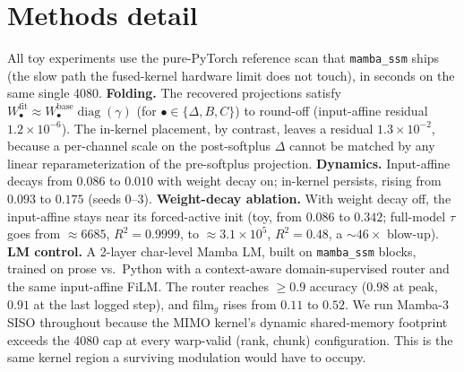 \documentclass{article}
\DeclareMathOperator{\diagop}{diag}
\newcommand{\diag}{\diagop}
\begin{document}
\section{Methods detail}\label{app:methods}

\noindent{}
\medskip

All toy experiments use the pure-PyTorch reference scan that \texttt{mamba\_ssm}
ships (the slow path the fused-kernel hardware limit does not touch), in seconds on
the same single 4080. \textbf{Folding.} The recovered projections satisfy
$W_\bullet^{\text{fit}}\approx W_\bullet^{\text{base}}\diag(\gamma)$ (for
$\bullet\in\{\Delta,B,C\}$) to round-off
(input-affine residual $1.2\times10^{-6}$). The in-kernel placement, by contrast,
leaves a residual $1.3\times10^{-2}$, because a per-channel scale on the
post-softplus $\Delta$ cannot be matched by any linear reparameterization of the
pre-softplus projection. \textbf{Dynamics.} Input-affine decays from
$0.086$ to $0.010$ with weight decay on; in-kernel persists, rising from
$0.093$ to $0.175$ (seeds 0--3). \textbf{Weight-decay ablation.} With weight
decay off, the input-affine stays near its forced-active init (toy, from
$0.086$ to $0.342$; full-model $\tau$ goes from $\approx6685$, $R^2{=}0.9999$, to
$\approx3.1\times10^5$, $R^2{=}0.48$, a ${\sim}46\times$ blow-up). \textbf{LM control.} A 2-layer char-level
Mamba LM, built on \texttt{mamba\_ssm} blocks, trained on prose vs.\ Python with a
context-aware domain-supervised router and the same input-affine FiLM. The router
reaches $\ge0.9$ accuracy ($0.98$ at peak, $0.91$ at the last logged step), and
$\mathrm{film}_g$ rises from $0.11$ to $0.52$. We
run Mamba-3 SISO throughout because the MIMO kernel's dynamic shared-memory
footprint exceeds the 4080 cap at every warp-valid (rank, chunk) configuration.
This is the same kernel region a surviving modulation would have to occupy.
\end{document}

